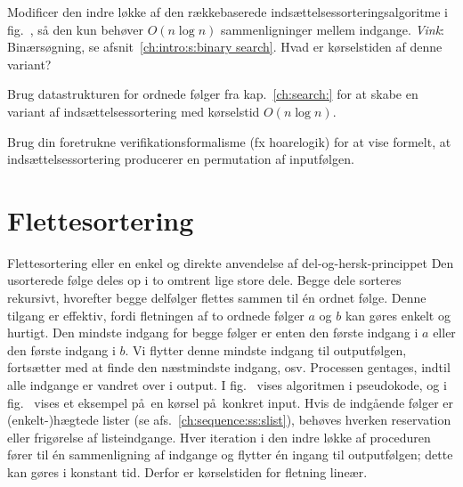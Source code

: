 \begin{exerc}
  Modificer den indre løkke af den rækkebaserede indsættelsessorteringsalgoritme i fig.~, så den kun behøver $O(n\log n)$ sammenligninger mellem indgange. 
  \emph{Vink}: Binærsøgning, se afsnit~\ref{ch:intro:s:binary search}.
  Hvad er kørselstiden af denne variant?    
\end{exerc}

\begin{exerc}
  Brug datastrukturen for ordnede følger fra kap.~\ref{ch:search:} for at skabe en variant af indsættelsessortering med kørselstid $O(n\log n)$. 
\end{exerc}

\begin{exerc}
  Brug din foretrukne verifikationsformalisme (fx hoarelogik) for at vise formelt, at indsættelsessortering producerer en permutation af inputfølgen.
\end{exerc}

\section{Flettesortering}
%
%
%

Flettesortering eller en enkel og direkte anvendelse af del-og-hersk-princippet
Den usorterede følge deles op i to omtrent lige store dele.
Begge dele sorteres rekursivt, hvorefter begge delfølger flettes sammen til én ordnet følge.
Denne tilgang er effektiv, fordi fletningen af to ordnede følger $a$ og $b$ kan gøres enkelt og hurtigt.
Den mindste indgang for begge følger er enten den første indgang i $a$ eller den første indgang i $b$.
Vi flytter denne mindste indgang til output\-følgen, fortsætter med at finde den næstmindste indgang, osv.
Processen gentages, indtil alle indgange er vandret over i output.
I fig.~ vises algoritmen i pseudokode, og i fig.~ vises et eksempel på en kørsel på konkret input.
Hvis de indgående følger er (enkelt-)hægtede lister (se afs.~\ref{ch:sequence:ss:slist}), behøves hverken reservation eller frigørelse af listeindgange.
Hver iteration i den indre løkke af proceduren  fører til én sammenligning af indgange og flytter én ingang til outputfølgen; dette kan gøres i konstant tid.
Derfor er kørselstiden for fletning lineær.

